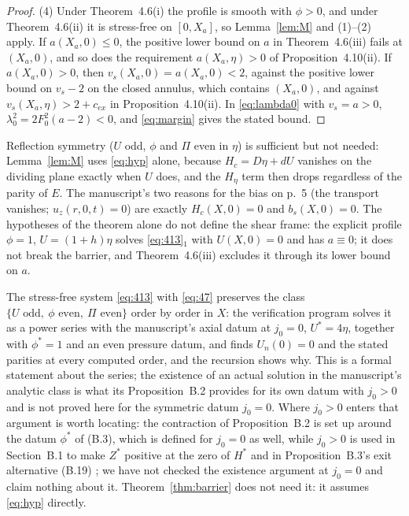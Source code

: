 \documentclass[11pt]{article}
\newcommand{\Hc}{H_c}
\newcommand{\bs}{b_s}
\newcommand{\vs}{v_s}
\begin{document}
\begin{proof}
(4) Under Theorem~4.6(i) the profile is smooth with $\phi>0$, and under Theorem~4.6(ii) it is stress-free on $[0,X_a]$, so Lemma~\ref{lem:M} and (1)--(2) apply. If $a(X_a,0)\le0$, the positive lower bound on $a$ in Theorem~4.6(iii) fails at $(X_a,0)$, and so does the requirement $a(X_a,\eta)>0$ of Proposition~4.10(ii). If $a(X_a,0)>0$, then $\vs(X_a,0)=a(X_a,0)<2$, against the positive lower bound on $\vs-2$ on the closed annulus, which contains $(X_a,0)$, and against $\vs(X_a,\eta)>2+c_{ex}$ in Proposition~4.10(ii). In \eqref{eq:lambda0} with $\vs=a>0$, $\lambda_0^2=2F_0^2(a-2)<0$, and \eqref{eq:margin} gives the stated bound.
\end{proof}

\begin{remark}\label{rem:hyp}
Reflection symmetry ($U$ odd, $\phi$ and $\Pi$ even in $\eta$) is sufficient but not needed: Lemma~\ref{lem:M} uses \eqref{eq:hyp} alone, because $\Hc=D\eta+dU$ vanishes on the dividing plane exactly when $U$ does, and the $H_\eta$ term then drops regardless of the parity of $E$. The manuscript's two reasons for the bias on p.~5 (the transport vanishes; $u_z(r,0,t)=0$) are exactly $\Hc(X,0)=0$ and $\bs(X,0)=0$. The hypotheses of the theorem alone do not define the shear frame: the explicit profile $\phi=1$, $U=(1+h)\eta$ solves \eqref{eq:413}$_1$ with $U(X,0)=0$ and has $a\equiv0$; it does not break the barrier, and Theorem~4.6(iii) excludes it through its lower bound on $a$.
\end{remark}

\begin{remark}\label{rem:prop}
The stress-free system \eqref{eq:413} with \eqref{eq:47} preserves the class $\{U\text{ odd},\ \phi\text{ even},\ \Pi\text{ even}\}$ order by order in $X$: the verification program solves it as a power series with the manuscript's axial datum at $j_0=0$, $U^*=4\eta$, together with $\phi^*=1$ and an even pressure datum, and finds $U_n(0)=0$ and the stated parities at every computed order, and the recursion shows why. This is a formal statement about the series; the existence of an actual solution in the manuscript's analytic class is what its Proposition~B.2 provides for its own datum with $j_0>0$ \cite[p.~146]{OpenAINS} and is not proved here for the symmetric datum $j_0=0$. Where $j_0>0$ enters that argument is worth locating: the contraction of Proposition~B.2 is set up around the datum $\phi^*$ of (B.3), which is defined for $j_0=0$ as well, while $j_0>0$ is used in Section~B.1 to make $Z^*$ positive at the zero of $H^*$ and in Proposition~B.3's exit alternative (B.19) \cite[pp.~144--150]{OpenAINS}; we have not checked the existence argument at $j_0=0$ and claim nothing about it. Theorem~\ref{thm:barrier} does not need it: it assumes \eqref{eq:hyp} directly.
\end{remark}
\end{document}
